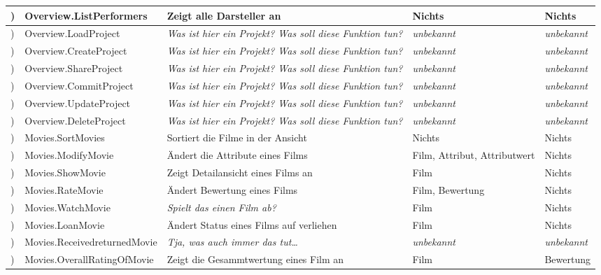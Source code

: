 \documentclass[ngerman]{scrartcl}
\begin{document}
\begin{tiny}
\begin{longtable}{@{\stepcounter{rowcount}} |l|l||l|l|l|  }
			\hline
			\therowcount) & Overview.ListPerformers  		& Zeigt alle Darsteller an & Nichts & Nichts\\
			\hline
			\therowcount) & Overview.LoadProject     		& \emph{Was ist hier ein Projekt? Was soll diese Funktion tun?} & \emph{unbekannt} & \emph{unbekannt}\\
			\hline
			\therowcount) & Overview.CreateProject   		& \emph{Was ist hier ein Projekt? Was soll diese Funktion tun?} & \emph{unbekannt} & \emph{unbekannt}\\
			\hline
			\therowcount) & Overview.ShareProject    		& \emph{Was ist hier ein Projekt? Was soll diese Funktion tun?} & \emph{unbekannt} & \emph{unbekannt}\\
			\hline
			\therowcount) & Overview.CommitProject   		& \emph{Was ist hier ein Projekt? Was soll diese Funktion tun?} & \emph{unbekannt} & \emph{unbekannt}\\
			\hline
			\therowcount) & Overview.UpdateProject   		& \emph{Was ist hier ein Projekt? Was soll diese Funktion tun?} & \emph{unbekannt} & \emph{unbekannt}\\
			\hline
			\therowcount) & Overview.DeleteProject   		& \emph{Was ist hier ein Projekt? Was soll diese Funktion tun?} & \emph{unbekannt} & \emph{unbekannt}\\
			\hline
			\hline
			\therowcount) & Movies.SortMovies        		& Sortiert die Filme in der Ansicht & Nichts & Nichts\\
			\hline
			\therowcount) & Movies.ModifyMovie       		& Ändert die Attribute eines Films & Film, Attribut, Attributwert & Nichts\\
			\hline
			\therowcount) & Movies.ShowMovie         		& Zeigt Detailansicht eines Films an & Film & Nichts\\
			\hline
			\therowcount) & Movies.RateMovie         		& Ändert Bewertung eines Films & Film, Bewertung & Nichts\\
			\hline
			\therowcount) & Movies.WatchMovie        		& \emph{Spielt das einen Film ab?} & Film & Nichts\\
			\hline
			\therowcount) & Movies.LoanMovie         		& Ändert Status eines Films auf verliehen & Film & Nichts\\
			\hline
			\therowcount) & Movies.ReceivedreturnedMovie	& \emph{Tja, was auch immer das tut\ldots} & \emph{unbekannt} & \emph{unbekannt}\\
			\hline
			\therowcount) & Movies.OverallRatingOfMovie		& Zeigt die Gesammtwertung eines Film an & Film & Bewertung\\

\end{longtable}
\end{tiny}
\end{document}
